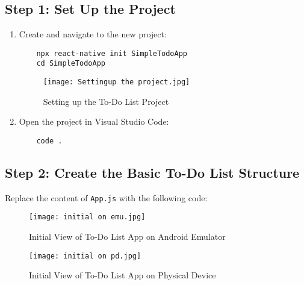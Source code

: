 \documentclass{article}
\begin{document}
\subsection{Step 1: Set Up the Project}
\begin{enumerate}
    \item Create and navigate to the new project:
    \begin{verbatim}
    npx react-native init SimpleTodoApp
    cd SimpleTodoApp
    \end{verbatim}
    \begin{figure}[H]
        \centering
        \texttt{[image: Settingup the project.jpg]}
        \caption{Setting up the To-Do List Project}
    \end{figure}
    
    \item Open the project in Visual Studio Code:
    \begin{verbatim}
    code .
    \end{verbatim}
\end{enumerate}

\subsection{Step 2: Create the Basic To-Do List Structure}
Replace the content of \texttt{App.js} with the following code:
\begin{figure}[H]
    \centering
    \texttt{[image: initial on emu.jpg]}
    \caption{Initial View of To-Do List App on Android Emulator}
\end{figure}
\begin{figure}[H]
    \centering
    \texttt{[image: initial on pd.jpg]}
    \caption{Initial View of To-Do List App on Physical Device}
\end{figure}
\end{document}
